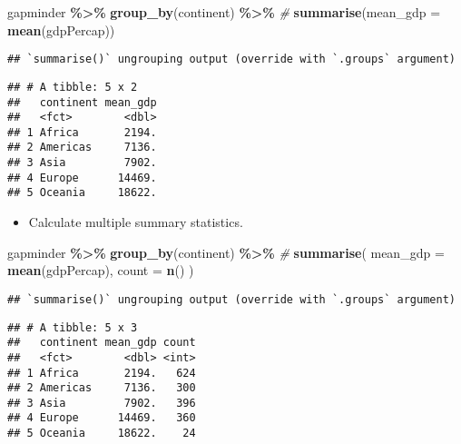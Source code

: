 \documentclass[
]{book}
\newenvironment{Shaded}{\begin{snugshade}}{\end{snugshade}}
\newcommand{\CommentTok}[1]{\textcolor[rgb]{0.56,0.35,0.01}{\textit{#1}}}
\newcommand{\DataTypeTok}[1]{\textcolor[rgb]{0.13,0.29,0.53}{#1}}
\newcommand{\KeywordTok}[1]{\textcolor[rgb]{0.13,0.29,0.53}{\textbf{#1}}}
\newcommand{\NormalTok}[1]{#1}
\newcommand{\OperatorTok}[1]{\textcolor[rgb]{0.81,0.36,0.00}{\textbf{#1}}}
\newcommand{\StringTok}[1]{\textcolor[rgb]{0.31,0.60,0.02}{#1}}
\providecommand{\tightlist}{%
  \setlength{\itemsep}{0pt}\setlength{\parskip}{0pt}}
\begin{document}
\begin{Shaded}
\begin{Highlighting}[]
\NormalTok{gapminder }\OperatorTok{\%\textgreater{}\%}
\StringTok{  }\KeywordTok{group\_by}\NormalTok{(continent) }\OperatorTok{\%\textgreater{}\%}\StringTok{ }\CommentTok{\#}
\StringTok{  }\KeywordTok{summarise}\NormalTok{(}\DataTypeTok{mean\_gdp =} \KeywordTok{mean}\NormalTok{(gdpPercap))}
\end{Highlighting}
\end{Shaded}

\begin{verbatim}
## `summarise()` ungrouping output (override with `.groups` argument)
\end{verbatim}

\begin{verbatim}
## # A tibble: 5 x 2
##   continent mean_gdp
##   <fct>        <dbl>
## 1 Africa       2194.
## 2 Americas     7136.
## 3 Asia         7902.
## 4 Europe      14469.
## 5 Oceania     18622.
\end{verbatim}

\begin{itemize}
\tightlist
\item
  Calculate multiple summary statistics.
\end{itemize}

\begin{Shaded}
\begin{Highlighting}[]
\NormalTok{gapminder }\OperatorTok{\%\textgreater{}\%}
\StringTok{  }\KeywordTok{group\_by}\NormalTok{(continent) }\OperatorTok{\%\textgreater{}\%}\StringTok{ }\CommentTok{\#}
\StringTok{  }\KeywordTok{summarise}\NormalTok{(}
    \DataTypeTok{mean\_gdp =} \KeywordTok{mean}\NormalTok{(gdpPercap),}
    \DataTypeTok{count =} \KeywordTok{n}\NormalTok{()}
\NormalTok{  )}
\end{Highlighting}
\end{Shaded}

\begin{verbatim}
## `summarise()` ungrouping output (override with `.groups` argument)
\end{verbatim}

\begin{verbatim}
## # A tibble: 5 x 3
##   continent mean_gdp count
##   <fct>        <dbl> <int>
## 1 Africa       2194.   624
## 2 Americas     7136.   300
## 3 Asia         7902.   396
## 4 Europe      14469.   360
## 5 Oceania     18622.    24
\end{verbatim}
\end{document}
